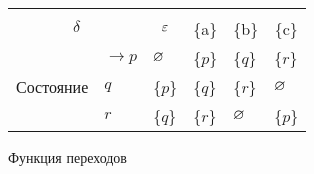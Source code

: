 \centering
\begin{tabular}{llllll}
\toprule
%
\multicolumn{2}{c}{\multirow{2}{*}{\Large $\delta$}}
	& \multicolumn{4}{c}{\text{Вход}} \\
%
\cmidrule(rl){3-6}
%
\multicolumn{2}{c}{}
	& \multicolumn{1}{c}{$\varepsilon$}
    & \multicolumn{1}{c}{\{a\}}
    & \multicolumn{1}{c}{\{b\}}
    & \multicolumn{1}{c}{\{c\}} \\
%
\midrule
%
\multirow{5}{*}{Состояние}
    & $\to p$ & $\varnothing$  		& \{$p$\} 		& \{$q$\} 	& \{$r$\} 	\\
    & $q$ & \{$p$\} 	& \{$q$\} 		& \{$r$\} 	& $\varnothing$     \\
    & $\boxed{r}$ & \{$q$\} 	& \{$r$\} 		& $\varnothing$		& \{$p$\} 	\\
\bottomrule
\end{tabular}
\caption{Функция переходов}
\label{tab5}

